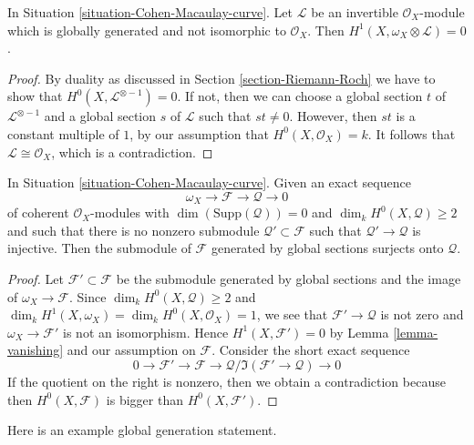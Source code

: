 \begin{lemma}
\label{lemma-vanishing-twist}
In Situation \ref{situation-Cohen-Macaulay-curve}. Let
$\mathcal{L}$ be an invertible $\mathcal{O}_X$-module which is
globally generated and not isomorphic to $\mathcal{O}_X$. Then
$H^1(X, \omega_X \otimes \mathcal{L}) = 0$.
\end{lemma}

\begin{proof}
By duality as discussed in Section \ref{section-Riemann-Roch} we have to
show that $H^0(X, \mathcal{L}^{\otimes - 1}) = 0$. If not, then we can
choose a global section $t$ of $\mathcal{L}^{\otimes - 1}$
and a global section $s$ of $\mathcal{L}$ such that $st \not = 0$.
However, then $st$ is a constant multiple of $1$, by our assumption
that $H^0(X, \mathcal{O}_X) = k$. It follows that
$\mathcal{L} \cong \mathcal{O}_X$, which is a contradiction.
\end{proof}

\begin{lemma}
\label{lemma-globally-generated}
In Situation \ref{situation-Cohen-Macaulay-curve}. Given an exact sequence
$$
\omega_X \to \mathcal{F} \to \mathcal{Q} \to 0
$$
of coherent $\mathcal{O}_X$-modules with $\dim(\text{Supp}(\mathcal{Q})) = 0$
and $\dim_k H^0(X, \mathcal{Q}) \geq 2$ and such that there is no nonzero
submodule $\mathcal{Q}' \subset \mathcal{F}$ such that
$\mathcal{Q}' \to \mathcal{Q}$ is injective.
Then the submodule of $\mathcal{F}$ generated by global
sections surjects onto $\mathcal{Q}$.
\end{lemma}

\begin{proof}
Let $\mathcal{F}' \subset \mathcal{F}$ be the submodule generated by
global sections and the image of $\omega_X \to \mathcal{F}$. Since
$\dim_k H^0(X, \mathcal{Q}) \geq 2$ and
$\dim_k H^1(X, \omega_X) = \dim_k H^0(X, \mathcal{O}_X) = 1$,
we see that $\mathcal{F}' \to \mathcal{Q}$ is not zero and
$\omega_X \to \mathcal{F}'$ is not an isomorphism.
Hence $H^1(X, \mathcal{F}') = 0$ by Lemma \ref{lemma-vanishing}
and our assumption on $\mathcal{F}$.
Consider the short exact sequence
$$
0 \to \mathcal{F}' \to \mathcal{F} \to
\mathcal{Q}/\Im(\mathcal{F}' \to \mathcal{Q}) \to 0
$$
If the quotient on the right is nonzero, then we obtain a contradiction
because then $H^0(X, \mathcal{F})$ is bigger than $H^0(X, \mathcal{F}')$.
\end{proof}

\noindent
Here is an example global generation statement.

